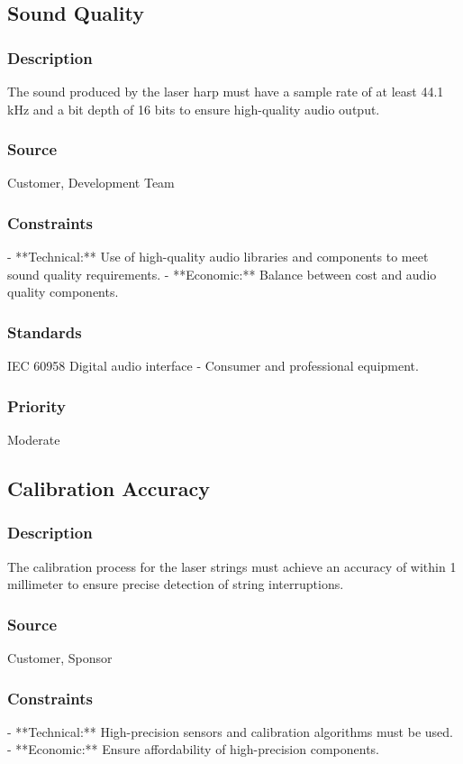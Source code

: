 \subsection{Sound Quality}
\subsubsection{Description}
The sound produced by the laser harp must have a sample rate of at least 44.1 kHz and a bit depth of 16 bits to ensure high-quality audio output.
\subsubsection{Source}
Customer, Development Team
\subsubsection{Constraints}
- **Technical:** Use of high-quality audio libraries and components to meet sound quality requirements.
- **Economic:** Balance between cost and audio quality components.
\subsubsection{Standards}
IEC 60958 Digital audio interface - Consumer and professional equipment.
\subsubsection{Priority}
Moderate


\subsection{Calibration Accuracy}
\subsubsection{Description}
The calibration process for the laser strings must achieve an accuracy of within 1 millimeter to ensure precise detection of string interruptions.
\subsubsection{Source}
Customer, Sponsor
\subsubsection{Constraints}
- **Technical:** High-precision sensors and calibration algorithms must be used.
- **Economic:** Ensure affordability of high-precision components.
